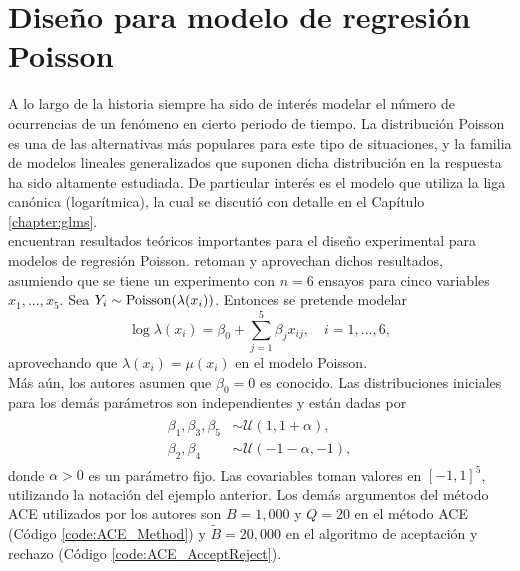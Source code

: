 \FloatBarrier








\section{Diseño para modelo de regresión Poisson}



A lo largo de la historia siempre ha sido de interés modelar el número de ocurrencias de un fenómeno en cierto periodo de tiempo. La distribución Poisson es una de las alternativas más populares para este tipo de situaciones, y la familia de modelos lineales generalizados que suponen dicha distribución en la respuesta ha sido altamente estudiada. De particular interés es el modelo que utiliza la liga canónica (logarítmica), la cual se discutió con detalle en el Capítulo \ref{chapter:glms}. \\


\cite{atkinson_woods} encuentran resultados teóricos importantes para el diseño experimental para modelos de regresión Poisson. \cite{Woods_etal} retoman y aprovechan dichos resultados, asumiendo que se tiene un experimento con $n=6$ ensayos para cinco variables $x_1, ..., x_5$. Sea $Y_i \sim \mathrm{Poisson}(\lambda(x_i))$. Entonces se pretende modelar
\begin{equation} \label{eq:mod2_poisson_regression1}
	\log \lambda(x_i) = \beta_0 + \sum_{j=1}^{5} \beta_j x_{ij}, \quad i=1,...,6,
\end{equation}
aprovechando que $\lambda(x_i) = \mu(x_i)$ en el modelo Poisson.\\


Más aún, los autores asumen que $\beta_0 = 0$ es conocido. 	Las distribuciones iniciales para los demás parámetros son independientes y están dadas por
\begin{align} \label{eq:mod2_params_initial}
\begin{split}
	\beta_1, \beta_3, \beta_5 &\sim \mathcal{U}(1, 1+\alpha),\\
    \beta_2, \beta_4 &\sim \mathcal{U}(-1-\alpha, -1),
\end{split}
\end{align}
donde $\alpha > 0$ es un parámetro fijo. Las covariables toman valores en $[-1, 1]^5$, utilizando la notación del ejemplo anterior. Los demás argumentos del método ACE utilizados por los autores son $B=1,000$ y $Q = 20$ en el método ACE (Código \ref{code:ACE_Method}) y $\tilde{B} = 20,000$ en el algoritmo de aceptación y rechazo (Código \ref{code:ACE_AcceptReject}). \\

